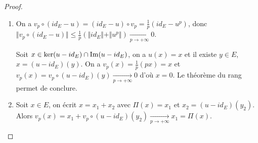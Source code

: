 \begin{proof}
	\phantom{}
	\begin{enumerate}
		\item On a $v_{p}\circ(id_{E}-u)=(id_{E}-u)\circ v_{p}=\frac{1}{p}(id_{E}-u^{p})$, donc $\Vert v_{p}\circ(id_{E}-u)\Vert\leqslant\frac{1}{p}(\Vert id_{E}\Vert+\Vert u^{p}\Vert)\xrightarrow[p\to+\infty]{}0$.
		
		Soit $x\in\ker(u-id_{E})\cap\mathrm{Im}(u-id_{E})$, on a $u(x)=x$ et il existe $y\in E$, $x=(u-id_{E})(y)$. On a $v_{p}(x)=\frac{1}{p}(px)=x$ et $v_{p}(x)=v_{p}\circ(u-id_{E})(y)\xrightarrow[p\to+\infty]{}0$ d'où $x=0$. Le théorème du rang permet de conclure.

		\item Soit $x\in E$, on écrit $x=x_{1}+x_{2}$ avec $\Pi(x)=x_{1}$ et $x_{2}=(u-id_{E})(y_{2})$. Alors $v_{p}(x)=x_{1}+v_{p}\circ(u-id_{E})(y_{2})\xrightarrow[p\to+\infty]{}x_{1}=\Pi(x)$.
	\end{enumerate}
\end{proof}

